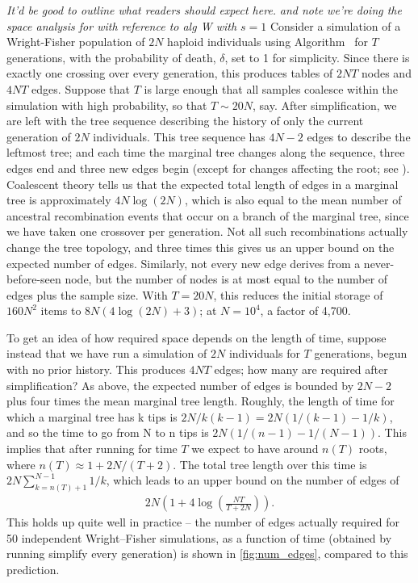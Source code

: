 \documentclass{article}
\newcommand{\jda}[1]{{\em \color{cyan} #1}}
\begin{document}
\jda{It'd be good to outline what readers should expect here.}
\jda{and note we're doing the space analysis for with reference to alg W with $s=1$}
Consider a simulation of a Wright-Fisher population of $2N$ haploid individuals
using Algorithm~
for $T$ generations,
with the probability of death, $\delta$, set to 1 for simplicity.
Since there is exactly one crossing over every generation,
this produces tables of
$2NT$ nodes and
$4NT$ edges.
Suppose that $T$ is large enough that all samples coalesce within the simulation with high probability,
so that $T \sim 20N$, say.
After simplification, we are left with the tree sequence describing the history
of only the current generation of $2N$ individuals.
This tree sequence has $4N-2$ edges to describe the leftmost tree;
and each time the marginal tree changes along the sequence,
three edges end and three new edges begin (except for changes affecting the root; see \citet{kelleher2016efficient}).
Coalescent theory tells us that
the expected total length of edges in a marginal tree is approximately $4N\log(2N)$,
which is also equal to the mean number of ancestral recombination events that occur on a branch of the marginal tree,
since we have taken one crossover per generation.
Not all such recombinations actually change the tree topology,
and three times this gives us an upper bound on the expected number of edges.
Similarly, not every new edge derives from a never-before-seen node,
but the number of nodes is at most equal to the number of edges plus the sample size.
With $T=20N$, this reduces the initial storage of $160 N^2$ items to $8N(4\log(2N) + 3)$;
at $N=10^4$, a factor of 4,700.

To get an idea of how required space depends on the length of time,
suppose instead that we have run a simulation of $2N$ individuals for $T$ generations,
begun with no prior history.
This produces $4NT$ edges; how many are required after simplification?
As above, the expected number of edges is bounded by $2N-2$ plus four times the mean marginal tree length.
Roughly, the length of time for which a marginal tree has k tips is
$2N/k(k-1) = 2N(1/(k-1) - 1/k)$,
and so the time to go from N to n tips is $2N(1/(n-1) - 1/(N-1))$.
This implies that after running for time $T$ we expect to
have around $n(T)$ roots, where $n(T) \approx 1 + 2N/(T+2)$.
The total tree length over this time is
$2 N \sum_{k=n(T)+1}^{N-1} 1/k$, which
leads to an upper bound on the number of edges of
\begin{align*}
    2 N \left( 1 + 4 \log\left( \frac{NT}{T + 2 N} \right)\right) .
\end{align*}
This holds up quite well in practice --
the number of edges actually required for 50 independent Wright--Fisher simulations,
as a function of time (obtained by running simplify every generation)
is shown in \ref{fig:num_edges}, compared to this prediction.
\end{document}
